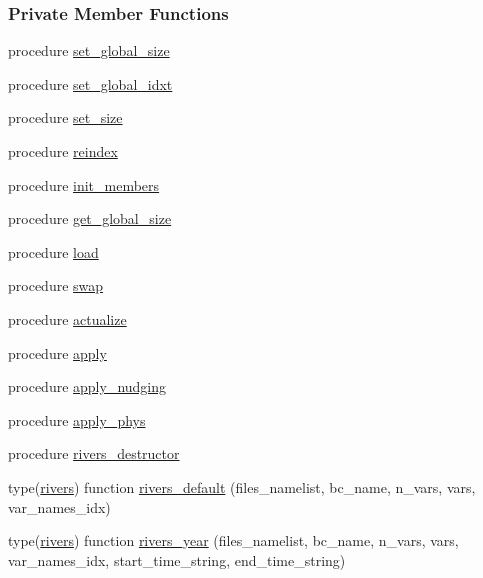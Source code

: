\subsubsection*{Private Member Functions}
\begin{DoxyCompactItemize}
\item 
procedure \mbox{\hyperlink{structrivers__mod_1_1rivers_a47e4b220c2eaf84a5ddbddd2c504f3c7}{set\+\_\+global\+\_\+size}}
\item 
procedure \mbox{\hyperlink{structrivers__mod_1_1rivers_a378a92f6f66820ec146e52b2c55803fc}{set\+\_\+global\+\_\+idxt}}
\item 
procedure \mbox{\hyperlink{structrivers__mod_1_1rivers_ae1f9392fa0882bffb1d45f802ad23a8d}{set\+\_\+size}}
\item 
procedure \mbox{\hyperlink{structrivers__mod_1_1rivers_a0c86ef831afa277f36aaef42d9e9ac4b}{reindex}}
\item 
procedure \mbox{\hyperlink{structrivers__mod_1_1rivers_a3ff0321c021f612d772817edbb872e37}{init\+\_\+members}}
\item 
procedure \mbox{\hyperlink{structrivers__mod_1_1rivers_a51f0caa3611caf9a391fe5797f46c031}{get\+\_\+global\+\_\+size}}
\item 
procedure \mbox{\hyperlink{structrivers__mod_1_1rivers_a4eac45372772ea12c7f18505a4de53ee}{load}}
\item 
procedure \mbox{\hyperlink{structrivers__mod_1_1rivers_a7bcfc95d699f097aed2975941cabe059}{swap}}
\item 
procedure \mbox{\hyperlink{structrivers__mod_1_1rivers_a7c1b4c7a383553f4cacdae90725f3249}{actualize}}
\item 
procedure \mbox{\hyperlink{structrivers__mod_1_1rivers_a97eb13e48a07c9020cb1b353d42a5466}{apply}}
\item 
procedure \mbox{\hyperlink{structrivers__mod_1_1rivers_aaa8c35a085317190f69e097caba60cfb}{apply\+\_\+nudging}}
\item 
procedure \mbox{\hyperlink{structrivers__mod_1_1rivers_a4f6360b228319a4189289cafc2e3fd74}{apply\+\_\+phys}}
\item 
procedure \mbox{\hyperlink{structrivers__mod_1_1rivers_a172c1ec96e9bd79a6a2ec289193068aa}{rivers\+\_\+destructor}}
\item 
type(\mbox{\hyperlink{structrivers__mod_1_1rivers}{rivers}}) function \mbox{\hyperlink{structrivers__mod_1_1rivers_a6ba78d48f5759b9bdf70beaaa958a0ce}{rivers\+\_\+default}} (files\+\_\+namelist, bc\+\_\+name, n\+\_\+vars, vars, var\+\_\+names\+\_\+idx)
\item 
type(\mbox{\hyperlink{structrivers__mod_1_1rivers}{rivers}}) function \mbox{\hyperlink{structrivers__mod_1_1rivers_ac4628566baa63304f7cb53f5935ddaee}{rivers\+\_\+year}} (files\+\_\+namelist, bc\+\_\+name, n\+\_\+vars, vars, var\+\_\+names\+\_\+idx, start\+\_\+time\+\_\+string, end\+\_\+time\+\_\+string)
\end{DoxyCompactItemize}

